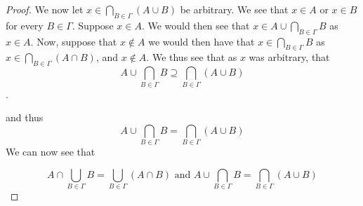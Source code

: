 \begin{proof}
    We now let $x \in \bigcap_{B\in \Gamma} (A \cup B)$ be arbitrary. 
    We see that $x \in A$ or $x \in B$ for every $B \in \Gamma$. 
    Suppose $x \in A$. We would then see that $x \in A \cup \bigcap_{B\in\Gamma} B$ as $x \in A$. 
    Now, suppose that $x \notin A$ we would then have that $x \in \bigcap_{B\in\Gamma} B$ as $x \in \bigcap_{B\in\Gamma} (A \cap B)$, and $x \notin A$. We thus see that as $x$ was arbitrary, that $$A \cup \bigcap_{B\in \Gamma} B \supseteq \bigcap_{B\in \Gamma} (A \cup B)$$.
    
    and thus 
    $$A \cup \bigcap_{B\in \Gamma} B = \bigcap_{B\in \Gamma} (A \cup B)$$
    We can now see that
    
    $$A \cap  \bigcup_{B\in \Gamma} B = \bigcup_{B\in \Gamma} (A \cap B)\text{  and  } A \cup \bigcap_{B\in \Gamma} B = \bigcap_{B\in \Gamma} (A \cup B)$$
    
\end{proof}
